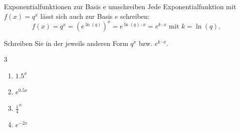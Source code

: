 \documentclass[11pt, a4paper, oneside]{article}
\begin{document}
	\checkered[4cm]
	
	\begin{hint}{Exponentialfunktionen zur Basis e umschreiben}
		Jede Exponentialfunktion mit $f(x) = q^x$ lässt sich auch zur Basis $e$ schreiben:
		$$f(x) = q^x = \left(e^{\ln(q)}\right)^x = e^{\ln(q) \cdot x}= e^{k \cdot x} \text{ mit } k = \ln(q).$$
	\end{hint}
	
	
	Schreiben Sie in der jeweils anderen Form $q^x$ bzw. $e^{k \cdot x}$.
	
	\begin{multicols}{3}
		\begin{enumerate}[label=\alph*)]
			\item $1.5^x$
			\item $e^{0.5x}$
			\item $\frac{1}{4}^x$
			\item $e^{-2x}$
		\end{enumerate}
	\end{multicols}
	
	\checkered[4cm]
	
\end{document}
